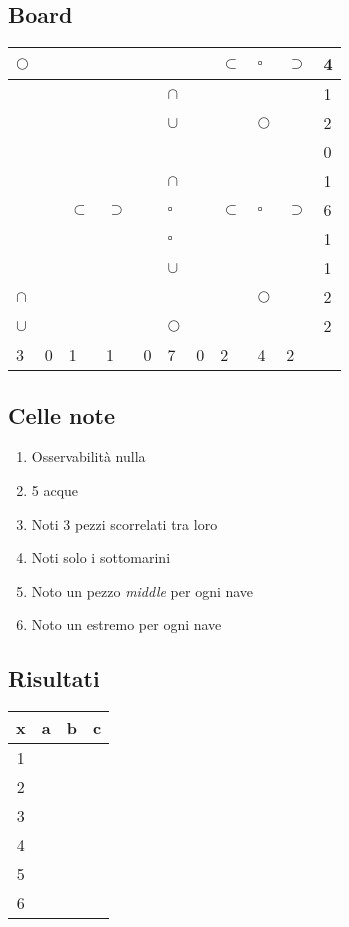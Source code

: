 \documentclass[11pt]{article}
\begin{document}
\subsection{Board}
\begin{table}[H]
    \begin{tabular}{|l|l|l|l|l|l|l|l|l|l||l|}
    \hline
     $\Circle$ &  &  &  &  &  &  & $\subset$ & $\square$ & $\supset$ & 4 \\ \hline
     &  &  &  &  & $\cap$ &  &  &  &  & 1 \\ \hline
     &  &  &  &  & $\cup$ &  &  & $\Circle$ &  & 2 \\ \hline
     &  &  &  &  &  &  &  &  &  & 0 \\ \hline
     &  &  &  &  & $\cap$ &  &  &  &  & 1 \\ \hline
     &  & $\subset$ & $\supset$ &  & $\square$ &  & $\subset$ & $\square$ & $\supset$ & 6 \\ \hline
     &  &  &  &  & $\square$ &  &  &  &  & 1 \\ \hline
     &  &  &  &  & $\cup$ &  &  &  &  & 1 \\ \hline
     $\cap$ &  &  &  &  &  &  &  & $\Circle$ &  & 2 \\ \hline
     $\cup$ &  &  &  &  & $\Circle$ &  &  &  &  & 2 \\ \hline \hline
     3 & 0 & 1 & 1 & 0 & 7 & 0 & 2 & 4 & 2 & \\ \hline
    \end{tabular}
\end{table}

\subsection{Celle note}
\begin{enumerate}
    \item Osservabilità nulla
    \item 5 acque 
    \item Noti 3 pezzi scorrelati tra loro
    \item Noti solo i sottomarini
    \item Noto un pezzo \emph{middle} per ogni nave
    \item Noto un estremo per ogni nave
\end{enumerate}

\subsection{Risultati}
\begin{table}[H]
    \begin{tabular}{|c|c|c|c|}
    \hline
    x & a & b & c \\ \hline \hline
    1 &  &  &  \\ \hline
    2 &  &  &  \\ \hline
    3 &  &  &  \\ \hline
    4 &  &  &  \\ \hline
    5 &  &  &  \\ \hline
    6 &  &  &  \\ \hline
    \end{tabular}
\end{table}
\end{document}
